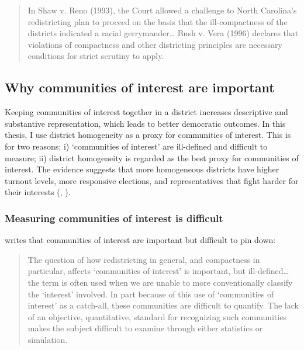 \documentclass[]{article}
\begin{document}
\begin{quote}
In Shaw v. Reno (1993), the Court allowed a challenge to North
Carolina's redistricting plan to proceed on the basis that the
ill-compactness of the districts indicated a racial gerrymander\ldots{}
Bush v. Vera (1996) declares that violations of compactness and other
districting principles are necessary conditions for strict scrutiny to
apply.
\end{quote}

\hypertarget{why-communities-of-interest-are-important}{%
\subsection{Why communities of interest are
important}\label{why-communities-of-interest-are-important}}

Keeping communities of interest together in a district increases
descriptive and substantive representation, which leads to better
democratic outcomes. In this thesis, I use district homogeneity as a
proxy for communities of interest. This is for two reasons: i)
`communities of interest' are ill-defined and difficult to measure; ii)
district homogeneity is regarded as the best proxy for communities of
interest. The evidence suggests that more homogeneous districts have
higher turnout levels, more responsive elections, and representatives
that fight harder for their interests (\cite{steph2012},
\cite{ogrady2018}).

\hypertarget{measuring-communities-of-interest-is-difficult}{%
\subsubsection{Measuring communities of interest is
difficult}\label{measuring-communities-of-interest-is-difficult}}

\citeauthor{altman1998} writes that communities of interest are
important but difficult to pin down:

\begin{quote}
The question of how redistricting in general, and compactness in
particular, affects `communities of interest' is important, but
ill-defined\ldots{} the term is often used when we are unable to more
conventionally classify the `interest' involved. In part because of this
use of `communities of interest' as a catch-all, these communities are
difficult to quantify. The lack of an objective, quantitative, standard
for recognizing such communities makes the subject difficult to examine
through either statistics or simulation.
\end{quote}
\end{document}
